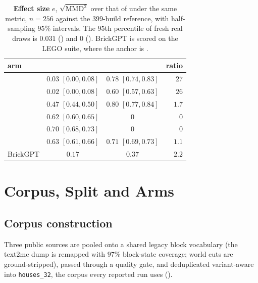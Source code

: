\begin{table}[h]
\centering
\small
\setlength{\tabcolsep}{3pt}
\caption{\textbf{Effect size} $e$, $\sqrt{\mathrm{MMD}^2}$ over that of \randomvox{} under
the same metric, $n{=}256$ against the $399$-build reference, with half-sampling $95\%$
intervals. The $95$th percentile of fresh real draws is $0.031$ (\mvkid{}) and $0$
(\vkid{}). BrickGPT is scored on the LEGO suite, where the anchor is \singlemode{}.}
\label{tab:effect}
\begin{tabular}{lccr}
\toprule
arm & \mvkid{} & \vkid{} & ratio \\
\midrule
\solidify{}     & $0.03$ {\scriptsize$[0.00, 0.08]$} & $0.78$ {\scriptsize$[0.74, 0.83]$} & $27$ \\
\hollow{}       & $0.02$ {\scriptsize$[0.00, 0.08]$} & $0.60$ {\scriptsize$[0.57, 0.63]$} & $26$ \\
\growshell{}    & $0.47$ {\scriptsize$[0.44, 0.50]$} & $0.80$ {\scriptsize$[0.77, 0.84]$} & $1.7$ \\
\matshuffle{}   & $0.62$ {\scriptsize$[0.60, 0.65]$} & $0$                                & $0$ \\
\monochrome{}   & $0.70$ {\scriptsize$[0.68, 0.73]$} & $0$                                & $0$ \\
\patchstitch{}  & $0.63$ {\scriptsize$[0.61, 0.66]$} & $0.71$ {\scriptsize$[0.69, 0.73]$} & $1.1$ \\
BrickGPT        & $0.17$                             & $0.37$                             & $2.2$ \\
\bottomrule
\end{tabular}
\end{table}

\section{Corpus, Split and Arms}
\label{app:setup}

\subsection{Corpus construction}
\label{app:corpus}

Three public sources are pooled onto a shared legacy block vocabulary (the
text2mc dump is remapped with $97\%$ block-state coverage; world cuts are
ground-stripped), passed through a quality gate, and deduplicated
variant-aware into \texttt{houses\_32}, the corpus every reported run uses
().

